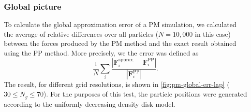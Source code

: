 \subsubsection{Global picture}
To calculate the global approximation error of a PM simulation, we calculated the average of relative differences over all particles ($N=10{,}000$ in this case) between the forces produced by the PM method and the exact result obtained using the PP method.
More precisely, we the error was defined as
\begin{equation}\label{eq:force-avg-relative-err}
    \frac{1}{N}\sum_{i} \frac{|\mathbf{F}_i^\text{approx.} - \mathbf{F}_i^\text{PP}|}{|\mathbf{F}_i^\text{PP}|}.
\end{equation}
The result, for different grid resolutions, is shown in \autoref{fig:pm-global-err-lap} ( $30 \leq N_g \leq 70$).
For the purposes of this test, the particle positions were generated according to the uniformly decreasing density disk model.
